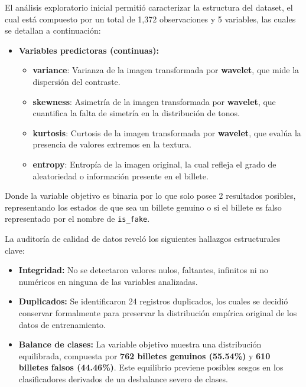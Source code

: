 \documentclass[conference]{IEEEtran}
\begin{document}
	El análisis exploratorio inicial permitió caracterizar la estructura del dataset, el cual está compuesto por un total de 1,372 observaciones y 5 variables, las cuales se detallan a continuación:
	
	\begin{itemize}
		\item \textbf{Variables predictoras (continuas):}
		\begin{itemize}
			\item \textbf{variance}: Varianza de la imagen transformada por \textbf{wavelet}, que mide la dispersión del contraste.
			\item \textbf{skewness}: Asimetría de la imagen transformada por \textbf{wavelet}, que cuantifica la falta de simetría en la distribución de tonos.
			\item \textbf{kurtosis}: Curtosis de la imagen transformada por \textbf{wavelet}, que evalúa la presencia de valores extremos en la textura.
			\item \textbf{entropy}: Entropía de la imagen original, la cual refleja el grado de aleatoriedad o información presente en el billete.
		\end{itemize}
		
	\end{itemize}
	
	
	Donde la variable objetivo es binaria por lo que solo posee 2 resultados posibles, representando los estados de que sea un billete genuino o si el billete es falso representado por el nombre de \texttt{is\_fake}.
	
	La auditoría de calidad de datos reveló los siguientes hallazgos estructurales clave:
	
	\begin{itemize}
		\item \textbf{Integridad:} No se detectaron valores nulos, faltantes, infinitos ni no numéricos en ninguna de las variables analizadas.
		\item \textbf{Duplicados:} Se identificaron 24 registros duplicados, los cuales se decidió conservar formalmente para preservar la distribución empírica original de los datos de entrenamiento.
		\item \textbf{Balance de clases:} La variable objetivo muestra una distribución equilibrada, compuesta por \textbf{762 billetes genuinos (55.54\%)} y \textbf{610 billetes falsos (44.46\%)}. Este equilibrio previene posibles sesgos en los clasificadores derivados de un desbalance severo de clases.
	\end{itemize}
	
\end{document}
